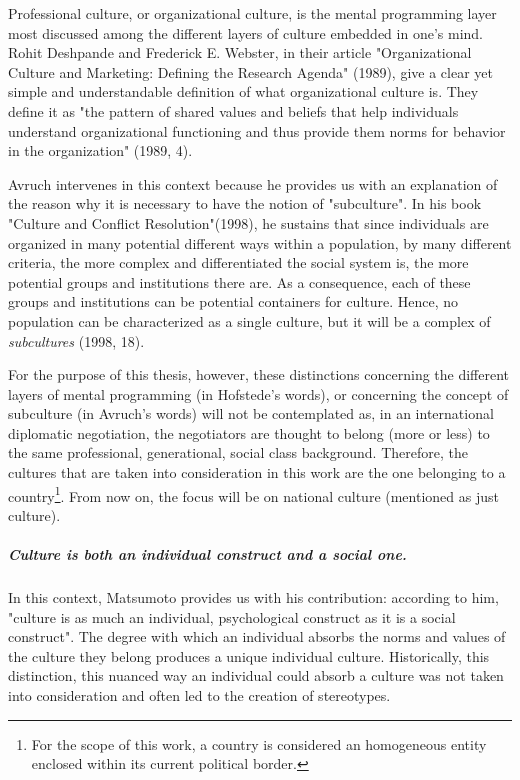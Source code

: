 \documentclass[../main.tex]{subfiles}
\begin{document}
Professional culture, or organizational culture, is the mental programming layer most discussed among the different layers of culture embedded in one's mind. Rohit Deshpande and Frederick E. Webster, in their article "Organizational Culture and Marketing: Defining the Research Agenda" (1989)\cite{rohit}, give a clear yet simple and understandable definition of what organizational culture is. They define it as "the pattern of shared values and beliefs that help individuals understand organizational functioning and thus provide them norms for behavior in the organization" (1989, 4).

Avruch intervenes in this context because he provides us with an explanation of the reason why it is necessary to have the notion of "subculture". In his book "Culture and Conflict Resolution"(1998), he sustains that since individuals are organized in many potential different ways within a population, by many different criteria, the more complex and differentiated the social system is, the more potential groups and institutions there are. As a consequence, each of these groups and institutions can be potential containers for culture. Hence, no population can be characterized as a single culture, but it will be a complex of \textit{subcultures} (1998, 18). %

For the purpose of this thesis, however, these distinctions concerning the different layers of mental programming (in Hofstede's words), or concerning the concept of subculture (in Avruch's words) will not be contemplated as, in an international diplomatic negotiation, the negotiators are thought to belong (more or less) to the same professional, generational, social class background. Therefore, the cultures that are taken into consideration in this work are the one belonging to a country\footnote{For the scope of this work, a country is considered an homogeneous entity enclosed within its current political border.}. From now on, the focus will be on national culture (mentioned as just culture).

\subparagraph*{Culture is both an individual construct and a social one.} In this context, Matsumoto provides us with his contribution: according to him, "culture is as much an individual, psychological construct as it is a social construct"\autocite[18]{matsumoto}. The degree with which an individual absorbs the norms and values of the culture they belong produces a unique individual culture. Historically, this distinction, this nuanced way an individual could absorb a culture was not taken into consideration and often led to the creation of stereotypes.
\end{document}
